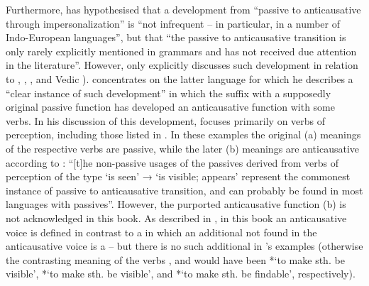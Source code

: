Furthermore, \cite[232]{kulikov:2011b} has hypothesised that a development from “passive to anticausative through impersonalization” is “not infrequent -- in particular, in a number of Indo-European languages”, but that “the passive to anticausative transition is only rarely explicitly mentioned in grammars and has not received due attention in the literature”. However, \cite[246ff.]{kulikov:2011b} only explicitly discusses such development in relation to , , , and Vedic ). \cite[232]{kulikov:2011b} concentrates on the latter language for which he describes a “clear instance of such development” in which the suffix  with a supposedly original passive function has developed an anticausative function with some verbs. In his discussion of this development, \citeauthor{kulikov:2011b} focuses primarily on verbs of perception, including those listed in . In these examples the original (a) meanings of the respective verbs are passive, while the later (b) meanings are anticausative according to \cite[234, 249]{kulikov:2011b}: “[t]he non-passive usages of the passives derived from verbs of perception of the type ‘is seen’ → ‘is visible; appears’ represent the commonest instance of passive to anticausative transition, and can probably be found in most languages with passives”. However, the purported anticausative function (b) is not acknowledged in this book. As described in , in this book an anticausative voice is defined in contrast to a  in which an additional  not found in the anticausative voice is a  -- but there is no such additional  in \citeauthor{kulikov:2011b}’s examples (otherwise the contrasting meaning of the verbs ,  and  would have been *‘to make sth. be visible’, *‘to make sth. be visible’, and *‘to make sth. be findable’, respectively).

